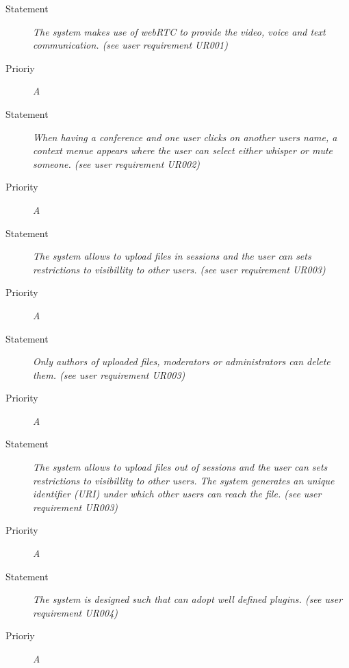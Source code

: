 \FR
\begin{description}
  \item [Statement]
    \textit{The system makes use of \gls{webRTC} to provide the video, voice and text communication.
    (see user requirement UR001)}
  \item [Prioriy] \textit{A}
\end{description}

\FR
\begin{description}
  \item [Statement] 
    \textit{When having a conference and one user clicks on another users name, a context menue appears where the user can select either whisper or mute someone.
		(see user requirement UR002)}
  \item [Priority] \textit{A}
\end{description}

\FR
\begin{description}
  \item [Statement] 
    \textit{The system allows to upload files in sessions and the user can sets restrictions to visibillity to other users.
    (see user requirement UR003)}
  \item [Priority] \textit{A}
\end{description}

\FR
\begin{description}
  \item [Statement] 
    \textit{Only authors of uploaded files, moderators or administrators can delete them.
    (see user requirement UR003)}
  \item [Priority] \textit{A}
\end{description}

\FR
\begin{description}
  \item [Statement] 
    \textit{The system allows to upload files out of sessions and the user can sets restrictions to visibillity to other users.  The system generates an unique identifier (URI) under which other users can reach the file.
    (see user requirement UR003)}
  \item [Priority] \textit{A}
\end{description}

\FR
\begin{description}
  \item [Statement]
    \textit{The system is designed such that can adopt well defined plugins.
    (see user requirement UR004)}
  \item [Prioriy] \textit{A}
\end{description}

